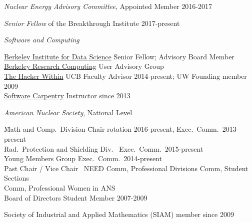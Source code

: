 \vspace*{-.25em}
\textit{Nuclear Energy Advisory Committee}, Appointed Member 2016-2017

\vspace*{-.5em}
\textit{Senior Fellow} of the Breakthrough Institute 2017-present

\vspace*{-.5em}
\textit{Software and Computing}
\vspace*{-.5em}
\begin{tabbing}
\hspace*{2 em}\=\href{http://bids.berkeley.edu/}{Berkeley Institute for Data Science} \= Senior Fellow; Advisory Board Member\\
%
\>\href{http://research-it.berkeley.edu/programs/berkeley-research-computing}{Berkeley Research Computing} \> User Advisory Group\\
%
%
\> \href{http://thehackerwithin.github.io/berkeley/}{The Hacker Within}  \> UCB Faculty Advisor 2014-present; UW Founding member 2009\\
%
\> \href{http://software-carpentry.org/}{Software Carpentry}  \> Instructor since 2013%
%
\end{tabbing}
%
\vspace*{-.5em}
\textit{American Nuclear Society}, National Level
\vspace*{-.5em}
\begin{tabbing}
\hspace*{2 em}\= Math and Comp.\ Division \hspace*{6em} \= Chair rotation 2016-present, Exec.\ Comm.\ 2013-present \\
%
\> Rad.\ Protection and Shielding Div.\ \> Exec.\ Comm.\ 2015-present\\
%
\> Young Members Group \> Exec.\ Comm.\ 2014-present\\
%
\> Past Chair / Vice Chair\ \> NEED Comm, Professional Divisions Comm, Student Sections\\ \> \> Comm, Professional Women in ANS\ \\
%
%
%
%
\> Board of Directors \>	Student Member 2007-2009
%
\end{tabbing}

\vspace*{-.5em}
Society of Industrial and Applied Mathematics (SIAM) member since 2009 

